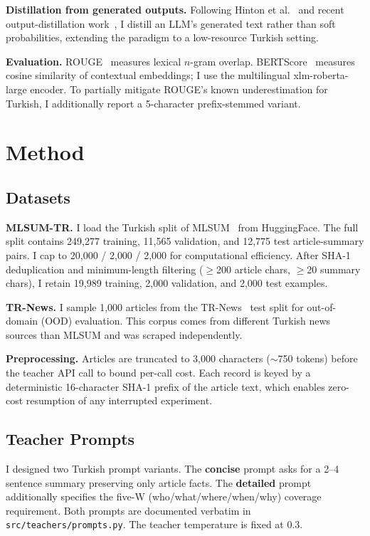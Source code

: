 \documentclass{llncs}
\begin{document}
\textbf{Distillation from generated outputs.} Following Hinton et al.~\cite{hinton2015distillation} and recent output-distillation work~\cite{taori2023alpaca,wang2023selfinstruct}, I distill an LLM's generated text rather than soft probabilities, extending the paradigm to a low-resource Turkish setting.

\textbf{Evaluation.} ROUGE~\cite{lin2004rouge} measures lexical $n$-gram overlap. BERTScore~\cite{zhang2020bertscore} measures cosine similarity of contextual embeddings; I use the multilingual xlm-roberta-large encoder. To partially mitigate ROUGE's known underestimation for Turkish, I additionally report a 5-character prefix-stemmed variant.

\section{Method}
\label{sec:method}

\subsection{Datasets}

\textbf{MLSUM-TR.} I load the Turkish split of MLSUM~\cite{scialom2020mlsum} from HuggingFace. The full split contains 249{,}277 training, 11{,}565 validation, and 12{,}775 test article-summary pairs. I cap to 20{,}000 / 2{,}000 / 2{,}000 for computational efficiency. After SHA-1 deduplication and minimum-length filtering ($\geq$200 article chars, $\geq$20 summary chars), I retain 19{,}989 training, 2{,}000 validation, and 2{,}000 test examples.

\textbf{TR-News.} I sample 1{,}000 articles from the TR-News~\cite{baykara2022trnews} test split for out-of-domain (OOD) evaluation. This corpus comes from different Turkish news sources than MLSUM and was scraped independently.

\textbf{Preprocessing.} Articles are truncated to 3{,}000 characters ($\sim$750 tokens) before the teacher API call to bound per-call cost. Each record is keyed by a deterministic 16-character SHA-1 prefix of the article text, which enables zero-cost resumption of any interrupted experiment.

\subsection{Teacher Prompts}

I designed two Turkish prompt variants. The \textbf{concise} prompt asks for a 2--4 sentence summary preserving only article facts. The \textbf{detailed} prompt additionally specifies the five-W (who/what/where/when/why) coverage requirement. Both prompts are documented verbatim in \texttt{src/teachers/prompts.py}. The teacher temperature is fixed at 0.3.
\end{document}
